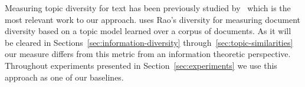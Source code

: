 Measuring topic diversity for text has been previously studied by~\cite{bache:2013} which is the most relevant work to our approach. \cite{bache:2013} uses Rao's diversity \cite{rao:1982} for measuring document diversity based on a topic model learned over a corpus of documents. As it will be cleared in Sections~\ref{sec:information-diversity} through~\ref{sec:topic-similarities} our measure differs from this metric from an information theoretic perspective. Throughout experiments presented in Section~\ref{sec:experiments} we use this approach as one of our baselines.